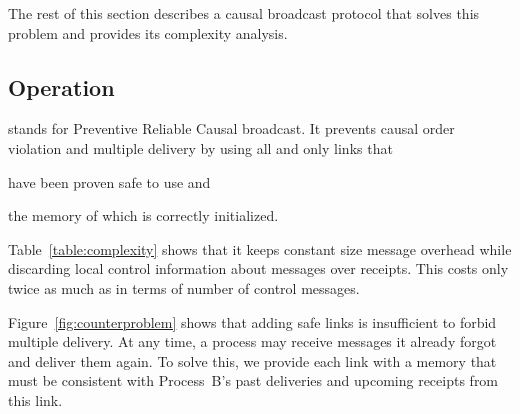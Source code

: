 The rest of this section describes a causal broadcast protocol that solves this
problem and provides its complexity analysis.


\subsection{Operation}

\RPCBROADCAST stands for Preventive Reliable Causal broadcast. It prevents
causal order violation and multiple delivery by using all and only links that
\begin{inparaenum}[(i)]
\item have been proven safe to use and
\item the memory of which is correctly initialized.
\end{inparaenum}
Table~\ref{table:complexity} shows that it keeps constant size message overhead
while discarding local control information about messages over receipts. This
costs only twice as much as \PCBROADCAST in terms of number of control messages.

Figure~\ref{fig:counterproblem} shows that adding safe links is insufficient to
forbid multiple delivery. At any time, a process may receive messages it already
forgot and deliver them again. To solve this, we provide each link with a memory
that must be consistent with Process~B's past deliveries and upcoming receipts
from this link.




